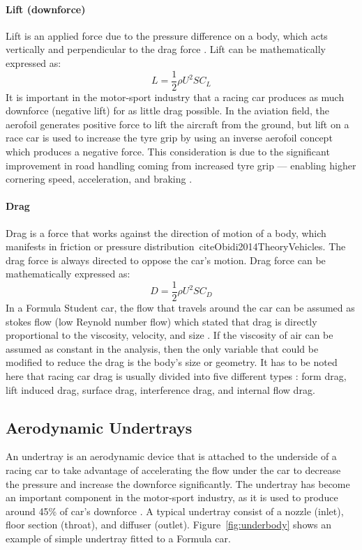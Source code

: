 \paragraph{Lift (downforce)}
Lift is an applied force due to the pressure difference on a body, which acts vertically and perpendicular to the drag force \cite{Scibor-Rylski1984RoadAerodynamics}. Lift can be mathematically expressed as:
\begin{equation}
    L = \frac{1}{2}\rho U^2 S C_L
\end{equation}
It is important in the motor-sport industry that a racing car produces as much downforce (negative lift) for as little drag possible. In the aviation field, the aerofoil generates positive force to lift the aircraft from the ground, but lift on a race car is used to increase the tyre grip by using an inverse aerofoil concept which produces a negative force. This consideration is due to the significant improvement in road handling coming from increased tyre grip --- enabling higher cornering speed, acceleration, and braking \cite{Barnard1997RoadIntroduction}.


\paragraph{Drag}
Drag is a force that works against the direction of motion of a body, which manifests in friction or pressure distribution~cite{Obidi2014TheoryVehicles}. The drag force is always directed to oppose the car's motion. Drag force can be mathematically expressed as:
\begin{equation}
    D = \frac{1}{2}\rho U^2 S C_D
\end{equation}
In a Formula Student car, the flow that travels around the car can be assumed as stokes flow (low Reynold number flow) which stated that drag is directly proportional to the viscosity, velocity, and size \cite{Obidi2014TheoryVehicles}. If the viscosity of air can be assumed as constant in the analysis, then the only variable that could be modified to reduce the drag is the body's size or geometry. It has to be noted here that racing car drag is usually divided into five different types \cite{Kelly1964AerodynamicsEngineers}: form drag, lift induced drag, surface drag, interference drag, and internal flow drag.

\subsection{Aerodynamic Undertrays}
An undertray is an aerodynamic device that is attached to the underside of a racing car to take advantage of accelerating the flow under the car to decrease the pressure and increase the downforce significantly. The undertray has become an important component in the motor-sport industry, as it is used to produce around 45\% of car's downforce \cite{Katz1995RaceSpeed}. A typical undertray consist of a nozzle (inlet), floor section (throat), and diffuser (outlet). Figure~\ref{fig:underbody} shows an example of simple undertray fitted to a Formula car.

